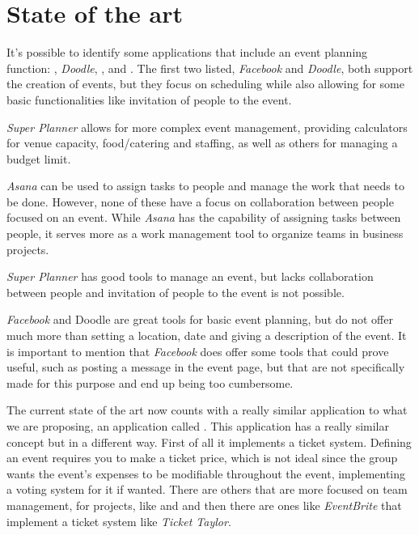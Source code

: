 
\chapter{State of the art} 
\label{ch:Chapter2}
\vfill \minitoc \newpage

It's possible to identify some applications that include an event planning function: \textit{\cite{facebook}}, \textit{Doodle}, \textit{\cite{superplanner}}, and \textit{\cite{asana}}. The first two listed, \textit{Facebook} and \textit{Doodle}, both support the creation of events, but they focus on scheduling while also allowing for some basic functionalities like invitation of people to the event. 

\textit{Super Planner} allows for more complex event management, providing calculators for venue capacity, food/catering and staffing, as well as others for managing a budget limit. 

\textit{Asana} can be used to assign tasks to people and manage the work that needs to be done. However, none of these have a focus on collaboration between people focused on an event. While \textit{Asana} has the capability of assigning tasks between people, it serves more as a work management tool to organize teams in business projects.

\textit{Super Planner} has good tools to manage an event, but lacks collaboration between people and invitation of people to the event is not possible. 

\textit{Facebook} and Doodle are great tools for basic event planning, but do not offer much more than setting a location, date and giving a description of the event. It is important to mention that \textit{Facebook} does offer some tools that could prove useful, such as posting a message in the event page, but that are not specifically made for this purpose and end up being too cumbersome.

The current state of the art now counts with a really similar application to what we are proposing, an application called \textit{\cite{eventbrite}}.
This application has a really similar concept but in a different way. First of all it implements a ticket system. Defining an event requires you to make a ticket price, which is not ideal since the group wants the event's expenses to be modifiable throughout the event, implementing a voting system for it if wanted. There are others that are more focused on team management, for projects, like \textit{\cite{cvent}} and \textit{\cite{xingevents}} and then there are ones like \textit{EventBrite} that implement a ticket system like \textit{Ticket Taylor}. 

